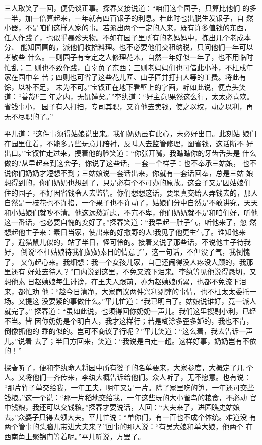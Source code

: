三人取笑了一回，便仍谈正事。探春又接说道：“咱们这个园子，只算比他们
的多一半，加一倍算起来，一年就有四百银子的利息。若此时也出脱生发银子，自
然小器，不是咱们这样人家的事。若派出两个一定的人来，既有许多值钱的东西，
任人作践了，也似乎暴殄天物。不如在园子里所有的老妈妈中，拣出几个老成本分、
能知园圃的，派他们收拾料理。也不必要他们交租纳税，只问他们一年可以孝敬些
什么。一则园子有专定之人修理花木，自然一年好似一年了，也不用临时忙乱；二
则也不致作践，白辜负了东西；三则老妈妈们也可借此小补，不枉成年家在园中辛
苦；四则也可省了这些花儿匠、山子匠并打扫人等的工费。将此有馀，以补不足，
未为不可。”宝钗正在地下看壁上的字画，听如此说，便点头笑道：“善哉!‘三
年之内，无饥馑矣。’”李纨道：“好主意!果然这么行，太太必喜欢。省钱事小，
园子有人打扫，专司其职，又许他去卖钱，使之以权，动之以利，再无不尽职的了。”

平儿道：“这件事须得姑娘说出来。我们奶奶虽有此心，未必好出口。此刻姑
娘们在园里住着，不能多弄些玩意儿陪衬，反叫人去监管修理，图省钱，这话断不
好出口。”宝钗忙走过来，摸着他的脸笑道：“你张开嘴，我瞧瞧你的牙齿舌头是
什么做的?从早起来到这会子，你说了这些话，一套一个样子：也不奉承三姑娘，
也不说你们奶奶才短想不到；三姑娘说一套话出来，你就有一套话回奉，总是三姑
娘想得到的，你们奶奶也想到了，只是必有个不可办的原故。这会子又是因姑娘们
住的园子，不好因省钱令人去监管。你们想想这话，要果真交给人弄钱去的，那人
自然是一枝花也不许掐，一个果子也不许动了，姑娘们分中自然是不敢讲究，天天
和小姑娘们就吵不清。他这远愁近虑，不亢不卑，他们奶奶就不是和咱们好，听他
这一番话，也必要自愧的变好了。”探春笑道：“我早起一肚子气，听他来了，忽
然想起他主子来：素日当家，使出来的好撒野的人!我见了他更生气了。谁知他来
了，避猫鼠儿似的，站了半日，怪可怜的。接着又说了那些话，不说他主子待我好，
倒说‘不枉姑娘待我们奶奶素日的情意了’，这一句话，不但没了气，我倒愧了，
又伤起心来。我细想：我一个女孩儿家，自己还闹得没人疼没人顾的，我那里还有
好处去待人？”口内说到这里，不免又流下泪来。李纨等见他说得恳切，又想他素
日赵姨娘每生诽谤，在王夫人跟前，亦为赵姨娘所累，也都不免流下泪来，都忙劝
他：“趁今日清净，大家商议两件兴利剔弊的事情，也不枉太太委托一场。又提这
没要紧的事做什么。”平儿忙道：“我已明白了。姑娘说谁好，竟一派人就完了。”
探春道：“虽如此说，也须得回你奶奶一声儿。我们这里搜剔小利，已经不当。皆
因你奶奶是个明白人，我才这样行；若是糊涂多歪多妒的，我也不肯，倒像抓他的
乖的似的。岂可不商议了行呢？”平儿笑道：“这么着，我去告诉一声儿。”说着
去了；半日方回来，笑道：“我说是白走一趟。这样好事，奶奶岂有不依的！”

探春听了，便和李纨命人将园中所有婆子的名单要来，大家参度，大概定了几
个人。又将他们一齐传来，李纨大概告诉给他们。众人听了，无不愿意。也有说：
“那片竹子单交给我，一年工夫，明年又是一片。除了家里吃的笋，一年还可交些
钱粮。”这一个说：“那一片稻地交给我，一年这些玩的大小雀鸟的粮食，不必动
官中钱粮，我还可以交钱粮。”探春才要说话，人回：“大夫来了，进园瞧史姑娘
去。”众婆子只得去领大夫。平儿忙说：“单你们，有一百也不成个体统。难道没
有两个管事的头脑儿带进大夫来？”回事的那人说：“有吴大娘和单大娘，他两个
在西南角上聚锦门等着呢。”平儿听说，方罢了。

